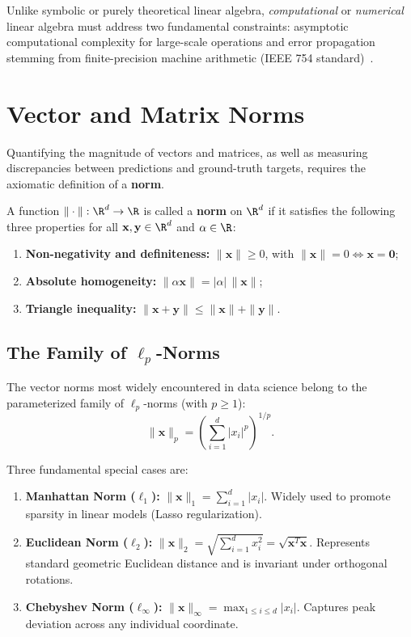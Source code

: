 Unlike symbolic or purely theoretical linear algebra, \emph{computational} or \emph{numerical} linear algebra must address two fundamental constraints: asymptotic computational complexity for large-scale operations and error propagation stemming from finite-precision machine arithmetic (IEEE 754 standard)~\cite{trefethen1997numerical}.

\FloatBarrier
\section{Vector and Matrix Norms}

Quantifying the magnitude of vectors and matrices, as well as measuring discrepancies between predictions and ground-truth targets, requires the axiomatic definition of a \textbf{norm}.

\begin{definition}
A function $\|\cdot\|: \R^d \to \R$ is called a \textbf{norm} on $\R^d$ if it satisfies the following three properties for all $\mathbf{x}, \mathbf{y} \in \R^d$ and $\alpha \in \R$:
\begin{enumerate}
    \item \textbf{Non-negativity and definiteness:} $\|\mathbf{x}\| \ge 0$, with $\|\mathbf{x}\| = 0 \iff \mathbf{x} = \mathbf{0}$;
    \item \textbf{Absolute homogeneity:} $\|\alpha \mathbf{x}\| = |\alpha| \, \|\mathbf{x}\|$;
    \item \textbf{Triangle inequality:} $\|\mathbf{x} + \mathbf{y}\| \le \|\mathbf{x}\| + \|\mathbf{y}\|$.
\end{enumerate}
\end{definition}

\subsection{The Family of \texorpdfstring{$\ell_p$}{lp}-Norms}

The vector norms most widely encountered in data science belong to the parameterized family of $\ell_p$-norms (with $p \ge 1$):
\begin{equation}
    \|\mathbf{x}\|_p = \left( \sum_{i=1}^d |x_i|^p \right)^{1/p}.
\end{equation}

Three fundamental special cases are:
\begin{enumerate}
    \item \textbf{Manhattan Norm ($\ell_1$):} $\|\mathbf{x}\|_1 = \sum_{i=1}^d |x_i|$. Widely used to promote sparsity in linear models (Lasso regularization).
    \item \textbf{Euclidean Norm ($\ell_2$):} $\|\mathbf{x}\|_2 = \sqrt{\sum_{i=1}^d x_i^2} = \sqrt{\mathbf{x}^T \mathbf{x}}$. Represents standard geometric Euclidean distance and is invariant under orthogonal rotations.
    \item \textbf{Chebyshev Norm ($\ell_\infty$):} $\|\mathbf{x}\|_\infty = \max_{1 \le i \le d} |x_i|$. Captures peak deviation across any individual coordinate.
\end{enumerate}

